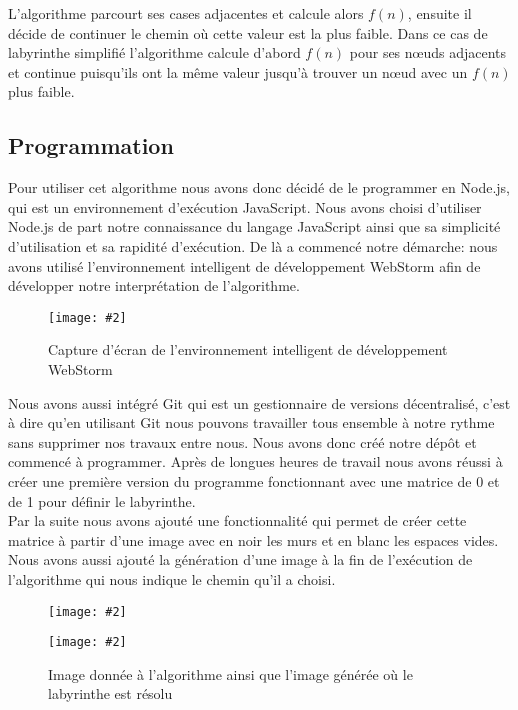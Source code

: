 \documentclass[]{report}
\newcommand{\includeimage}[2][]{%
\imgsrc{#2}
\begin{latexonly}
    \texttt{[image: \#2]}
\end{latexonly}
}
\theoremstyle{definition}
\begin{document}
{L’algorithme parcourt ses cases adjacentes et calcule alors \(f(n)\), ensuite il décide de continuer le chemin où cette valeur est la plus faible. Dans ce cas de labyrinthe simplifié l’algorithme calcule d’abord \(f(n)\) pour ses nœuds adjacents et continue puisqu’ils ont la même valeur jusqu’à trouver un nœud avec un \(f(n)\) plus faible.}

\subsection{Programmation}

{Pour utiliser cet algorithme nous avons donc décidé de le programmer en Node.js, qui est un environnement d'exécution JavaScript. Nous avons choisi d’utiliser Node.js de part notre connaissance du langage JavaScript ainsi que sa simplicité d’utilisation et sa rapidité d'exécution. De là a commencé notre démarche: nous avons utilisé l’environnement intelligent de développement WebStorm afin de développer notre interprétation de l’algorithme. }

\begin{figure}[H]
    \centering
    \includeimage[height=10cm]{webstorm.png}
    \caption{Capture d'écran de l'environnement intelligent de développement WebStorm}
\end{figure}

{Nous avons aussi intégré Git qui est un gestionnaire de versions décentralisé, c’est à dire qu’en utilisant Git nous pouvons travailler tous ensemble à notre rythme sans supprimer nos travaux entre nous. Nous avons donc créé notre dépôt et commencé à programmer.
Après de longues heures de travail nous avons réussi à créer une première version du programme fonctionnant avec une matrice de 0 et de 1 pour définir le labyrinthe.}\\
{Par la suite nous avons ajouté une fonctionnalité qui permet de créer cette matrice à partir d’une image avec en noir les murs et en blanc les espaces vides. Nous avons aussi ajouté la génération d’une image à la fin de l’exécution de l’algorithme qui nous indique le chemin qu’il a choisi.}

\begin{figure}[H]
    \centering
    \includeimage[height=5cm]{maze1.png}
    \includeimage[height=5cm]{maze2.png}
    \caption{Image donnée à l'algorithme ainsi que l'image générée où le labyrinthe est résolu}
\end{figure}
\end{document}
